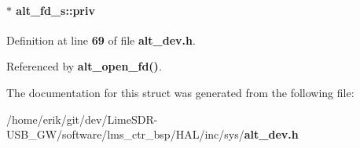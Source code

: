 \paragraph[{priv}]{$\ast$ alt\+\_\+fd\+\_\+s\+::priv}\label{structalt__fd__s_ae2e8abc4815601dc55ce6bd217fa92b1}


Definition at line {\bf 69} of file {\bf alt\+\_\+dev.\+h}.



Referenced by {\bf alt\+\_\+open\+\_\+fd()}.



The documentation for this struct was generated from the following file\+:\begin{DoxyCompactItemize}
\item 
/home/erik/git/dev/\+Lime\+S\+D\+R-\/\+U\+S\+B\+\_\+\+G\+W/software/lms\+\_\+ctr\+\_\+bsp/\+H\+A\+L/inc/sys/{\bf alt\+\_\+dev.\+h}\end{DoxyCompactItemize}
